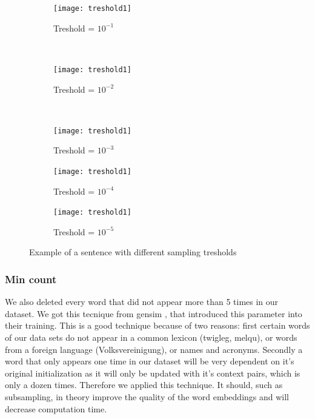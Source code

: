 \begin{figure}
    \centering
    \begin{subfigure}[b]{\textwidth}
        \texttt{[image: treshold1]}
        \caption{Treshold = $10^{-1}$}
        \label{fig:treshold1}
    \end{subfigure}
    ~ %
    \begin{subfigure}[b]{\textwidth}
        \texttt{[image: treshold1]}
        \caption{Treshold = $10^{-2}$}
        \label{fig:treshold2}
    \end{subfigure}
    ~ %
     \begin{subfigure}[b]{\textwidth}
        \texttt{[image: treshold1]}
        \caption{Treshold = $10^{-3}$}
        \label{fig:treshold3}
    \end{subfigure}
   \begin{subfigure}[b]{\textwidth}
        \texttt{[image: treshold1]}
        \caption{Treshold = $10^{-4}$}
        \label{fig:treshold4}
    \end{subfigure}
     \begin{subfigure}[b]{\textwidth}
        \texttt{[image: treshold1]}
        \caption{Treshold = $10^{-5}$}
        \label{fig:treshold5}
    \end{subfigure}
    \caption{Example of a sentence with different sampling tresholds}\label{fig:treshold_examples}
\end{figure}

\subsubsection{Min count}
We also deleted every word that did not appear more than 5 times in our dataset. We got this tecnique from gensim \cite{gensim}, that introduced this parameter into their training. This is a good technique because of two reasons: first certain words of our data sets do not appear in a common lexicon (twigleg, melqu), or words from a foreign language (Volksvereinigung), or names and acronyms. Secondly a word that only appears one time in our dataset will be very dependent on it's original initialization as it will only be updated with it's context pairs, which is only a dozen times. Therefore we applied this technique. It should, such as subsampling, in theory improve the quality of the word embeddings and  will decrease computation time. 

